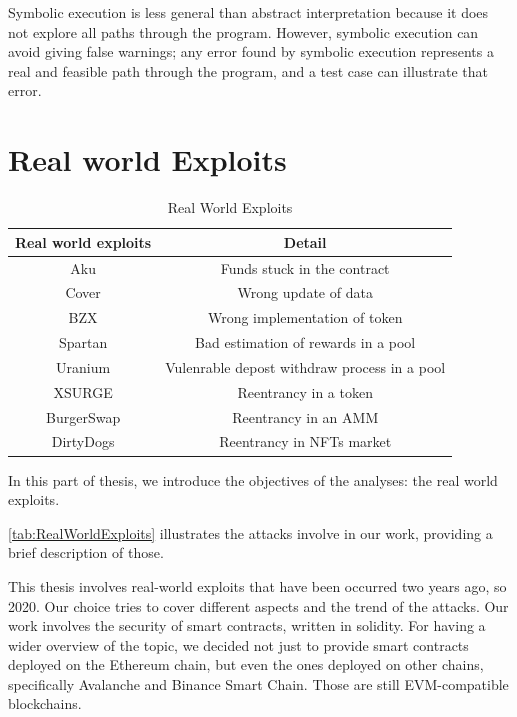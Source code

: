 Symbolic execution is less general than abstract interpretation because it does not explore all paths through the program. 
However, symbolic execution can avoid giving false warnings; any error found by symbolic execution represents a real and feasible path through the program, 
and a test case can illustrate that error.


\chapter{Real world Exploits}
\label{ch:Exploits}
\begin{center}

\begin{table}
    \caption{Real World Exploits}
        \label{tab:RealWorldExploits}
        \begin{tabular}{cc}
        \toprule
            Real world exploits & Detail\\
            \midrule
            Aku & Funds stuck in the contract\\
            Cover & Wrong update of data\\
            BZX & Wrong implementation of token\\
            Spartan &  Bad estimation of rewards in a pool\\
            Uranium & Vulenrable depost withdraw process in a pool\\
            XSURGE &  Reentrancy in a token \\
            BurgerSwap &  Reentrancy in an AMM \\
            DirtyDogs &  Reentrancy in NFTs market \\
        \bottomrule
        \end{tabular}
    \end{table}    
\end{center}

In this part of thesis, we introduce the objectives of the analyses: the real world exploits. 

\autoref{tab:RealWorldExploits} illustrates the attacks involve in our work, providing a brief description of those. 

This thesis involves real-world exploits that have been occurred two years ago, so 2020. 
Our choice tries to cover different aspects and the trend of the attacks. 
Our work involves the security of smart contracts, written in solidity. 
For having a wider overview of the topic, 
we decided not just to provide smart contracts deployed on the Ethereum chain, 
but even the ones deployed on other chains, specifically Avalanche and Binance Smart Chain. 
Those are still EVM-compatible blockchains. 

